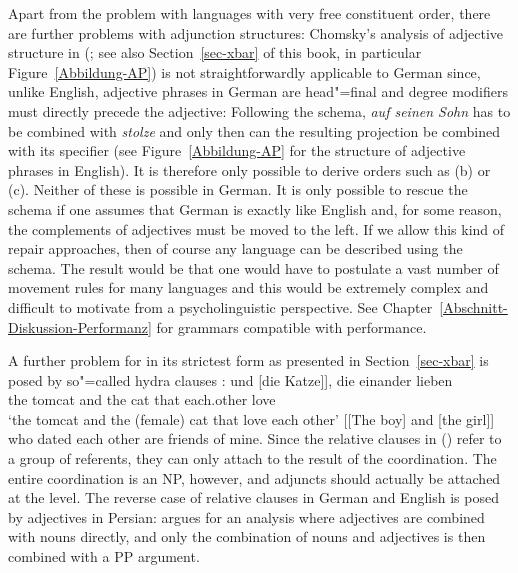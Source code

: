 Apart from the problem with languages with very free constituent order, there are further problems with adjunction structures: Chomsky's analysis of adjective structure
in \xbart (\citealp[]{Chomsky70a}; see also Section~\ref{sec-xbar} of this book, in
particular Figure~\vref{Abbildung-AP}) is not straightforwardly applicable to German since, unlike
English, adjective phrases in German are head"=final and degree modifiers must directly precede the
adjective: 
\eal
{}
\zl
Following the \xbar schema, \emph{auf seinen Sohn} has to be combined with \emph{stolze} and only then can the
resulting \abar projection be combined with its specifier (see Figure~\vref{Abbildung-AP} for the structure of adjective
phrases in English). It is therefore only possible to derive orders such as (b) or (c). Neither of these
is possible in German. It is only possible to rescue the \xbar schema if one assumes that German is
exactly like English and, for some reason, the complements of adjectives must be moved to the left. If we allow this kind of repair
approaches, then of course any language can be described using the \xbar schema. The result would be that one would have
to postulate a vast number of movement rules for many languages and this would be extremely complex and difficult
to motivate from a psycholinguistic perspective. See Chapter~\ref{Abschnitt-Diskussion-Performanz} for grammars compatible with performance.

A further problem for \xbart in its strictest form as presented in Section~\ref{sec-xbar} is posed by so"=called hydra clauses \citep{PR70a,Link84a-u,Kiss2005a}:
\eal
\ex {}
\gll [[der Kater] und [die Katze]], die einander lieben\\
     \spacebr{}\spacebr{}the tomcat and the cat that each.other love\\
\glt `the tomcat and the (female) cat that love each other'
\ex {}[[The boy] and [the girl]] who dated each other are friends of mine. 
\zl
Since the relative clauses in () refer to a group of referents, they can only attach to the result of the coordination.
The entire coordination is an NP, however, and adjuncts should actually be attached at the \xbar level. The reverse case of relative clauses
in German and English is posed by adjectives in Persian: \citet{Samvelian2007a} argues for an analysis where adjectives are combined with nouns
directly, and only the combination of nouns and adjectives is then combined with a PP argument.

